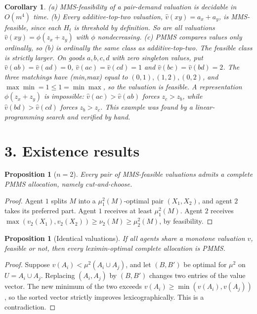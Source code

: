 \documentclass[11pt]{article}
\newtheorem{proposition}[theorem]{Proposition}
\newtheorem{corollary}[theorem]{Corollary}
\theoremstyle{definition}
\begin{document}
\begin{corollary}
(a) MMS-feasibility of a pair-demand valuation is decidable in $O(m^4)$ time.
(b) Every \emph{additive-top-two} valuation, $\hat v(xy)=a_x+a_y$, is MMS-feasible, since each $H_t$ is threshold by
definition. So are all valuations $\hat v(xy)=\phi(z_x+z_y)$ with $\phi$ nondecreasing.
(c) PMMS compares values only ordinally, so (b) is ordinally the same class as additive-top-two. The feasible class is
strictly larger. On goods $a,b,c,d$ with zero singleton values, put $\hat v(ab)=\hat v(ad)=0$, $\hat v(ac)=\hat v(cd)=1$
and $\hat v(bc)=\hat v(bd)=2$. The three matchings have (min,max) equal to $(0,1),(1,2),(0,2)$, and
$\max\min=1\le1=\min\max$, so the valuation is feasible. A representation $\phi(z_x+z_y)$ is impossible: $\hat v(ac)>\hat v(ab)$
forces $z_c>z_b$, while $\hat v(bd)>\hat v(cd)$ forces $z_b>z_c$. This example was found by a linear-programming search
and verified by hand.
\end{corollary}

\section*{3. Existence results}
\begin{proposition}[$n=2$]\label{prop:two}
Every pair of MMS-feasible valuations admits a complete PMMS allocation, namely cut-and-choose.
\end{proposition}
\begin{proof}
Agent $1$ splits $M$ into a $\mu^2_1(M)$-optimal pair $(X_1,X_2)$, and agent $2$ takes its preferred part. Agent $1$ receives
at least $\mu^2_1(M)$. Agent $2$ receives $\max(v_2(X_1),v_2(X_2))\ge\nu_2(M)\ge\mu_2^2(M)$, by feasibility.
\end{proof}

\begin{proposition}[Identical valuations]\label{prop:ident}
If all agents share a monotone valuation $v$, feasible or not, then every leximin-optimal complete allocation is PMMS.
\end{proposition}
\begin{proof}
Suppose $v(A_i)<\mu^2(A_i\cup A_j)$, and let $(B,B')$ be optimal for $\mu^2$ on $U=A_i\cup A_j$. Replacing $(A_i,A_j)$ by
$(B,B')$ changes two entries of the value vector. The new minimum of the two exceeds $v(A_i)\ge\min(v(A_i),v(A_j))$, so the
sorted vector strictly improves lexicographically. This is a contradiction.
\end{proof}
\end{document}
